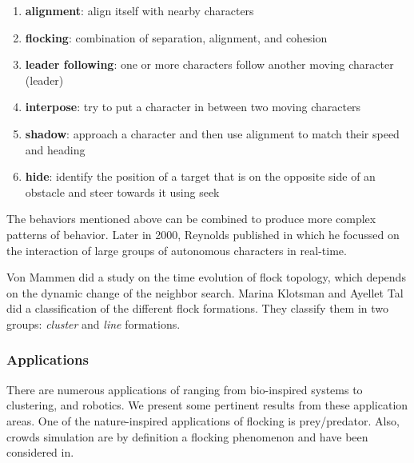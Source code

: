 \begin{enumerate}
\item \textbf{alignment}: align itself with nearby characters
\item \textbf{flocking}: combination of separation, alignment, and cohesion
\item \textbf{leader following}: one or more characters follow another moving character (leader)
\item \textbf{interpose}: try to put a character in between two moving characters
\item \textbf{shadow}: approach a character and then use alignment to match their speed and heading
\item \textbf{hide}: identify the position of a target that is on the opposite side of an obstacle and  steer towards it using seek
\end{enumerate} 
 
The behaviors mentioned above can be combined to produce more complex patterns of behavior. Later in 2000, Reynolds published \cite{craigInteractionGroups} in which he focussed on the interaction of large groups of autonomous characters in real-time. 

Von Mammen did a study on the time evolution of flock topology, which depends on the dynamic change of the neighbor search\cite{spatialSwarms}. Marina Klotsman and Ayellet Tal  did a classification of the different flock formations\cite{lineFormations}. They classify them in two groups: \textit{cluster} and \textit{line} formations.


\subsubsection{Applications}
There are numerous applications of ranging from bio-inspired systems to clustering, and robotics. We present some pertinent results from these application areas. One of the nature-inspired applications of flocking is prey/predator\cite{gems2}. Also, crowds simulation are by definition a flocking phenomenon and have been considered in\cite{crowdsPS3}. 

